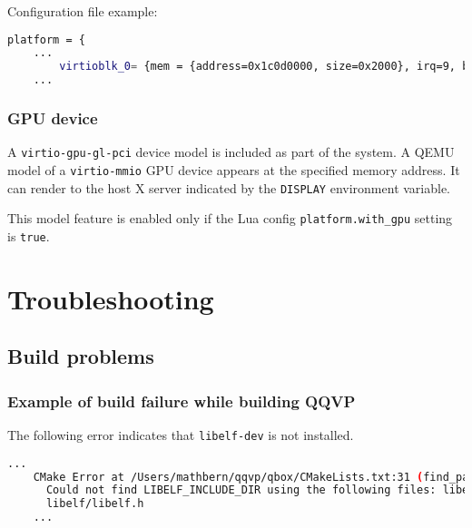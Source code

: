 Configuration file example:

\small
\begin{lstlisting}[language=bash]
    platform = {
    ...
        virtioblk_0= {mem = {address=0x1c0d0000, size=0x2000}, irq=9, blkdev_str="file="..top().."system_qdrive.img,format=raw,if=none"};
    ...
\end{lstlisting}
\normalsize


\subsection{GPU device}
\label{sec:gpuDevice}

A {\small{\lstinline!virtio-gpu-gl-pci!}} device model is included as part
of the system. A QEMU model of a {\small{\lstinline!virtio-mmio!}} GPU
device appears at the specified memory address. It can render to the host
X server indicated by the {\small{\lstinline!DISPLAY!}} environment variable.

This model feature is enabled only if the Lua config
{\small{\lstinline!platform.with_gpu!}} setting is {\small{\lstinline!true!}}.

\chapter{Troubleshooting}

\section{Build problems}

\subsection{Example of build failure while building QQVP}

The following error indicates that {\small{\lstinline!libelf-dev!}} is not installed.

\small
\begin{lstlisting}[language=bash]
    ...
    CMake Error at /Users/mathbern/qqvp/qbox/CMakeLists.txt:31 (find_path):
      Could not find LIBELF_INCLUDE_DIR using the following files: libelf.h,
      libelf/libelf.h
    ...
\end{lstlisting}
\normalsize

